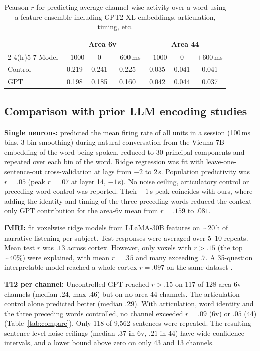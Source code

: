 \documentclass[11pt]{article}
\begin{document}
\begin{table}[h]
\centering
\label{tab:lagged}
\begin{tabular}{lcccccc}
\toprule
 & \multicolumn{3}{c}{Area 6v} & \multicolumn{3}{c}{Area 44} \\
\cmidrule(lr){2-4}\cmidrule(lr){5-7}
Model & $-1000$ & $0$ & $+600$\,ms & $-1000$ & $0$ & $+600$\,ms \\
\midrule
Control & 0.219 & 0.241 & 0.225 & 0.035 & 0.041 & 0.041 \\
GPT & 0.198 & 0.185 & 0.160 & 0.042 & 0.044 & 0.037 \\
\bottomrule
\end{tabular}
\caption{Pearson $r$ for predicting average channel-wise activity over a word using a feature ensemble including GPT2-XL embeddings, articulation, timing, etc.}
\end{table}

\subsection{Comparison with prior LLM encoding studies}

\textbf{Single neurons:} \citet{cai2026language} predicted the mean firing rate of all units in a session (100\,ms bins, 3-bin smoothing) during natural conversation from the Vicuna-7B embedding of the word being spoken, reduced to 30 principal components and repeated over each bin of the word. Ridge regression was fit with leave-one-sentence-out cross-validation at lags from $-2$ to $2$\,s. Population predictivity was $r=.05$ (peak $r=.07$ at layer 14, $-1$\,s). No noise ceiling, articulatory control or preceding-word control was reported. Their $-1$\,s peak coincides with ours, where adding the identity and timing of the three preceding words reduced the context-only GPT contribution for the area-6v mean from $r=.159$ to $.081$.

\textbf{fMRI:} \citet{antonello2024generative} fit voxelwise ridge models from LLaMA-30B features on ${\sim}20$\,h of narrative listening per subject. Test responses were averaged over 5--10 repeats. Mean test $r$ was $.13$ across cortex. However, only voxels with $r>.15$ (the top ${\sim}40\%$) were explained, with mean $r=.35$ and many exceeding $.7$. A 35-question interpretable model reached a whole-cortex $r=.097$ on the same dataset \cite{singh2025evaluating}.

\textbf{T12 per channel:} Uncontrolled GPT reached $r>.15$ on 117 of 128 area-6v channels (median $.24$, max $.46$) but on no area-44 channels. The articulation control alone predicted better (median $.29$). With articulation, word identity and the three preceding words controlled, no channel exceeded $r=.09$ (6v) or $.05$ (44) (Table~\ref{tab:compare}). Only 118 of 9,562 sentences were repeated. The resulting sentence-level noise ceilings (median $.37$ in 6v, $.21$ in 44) have wide confidence intervals, and a lower bound above zero on only 43 and 13 channels.
\end{document}
